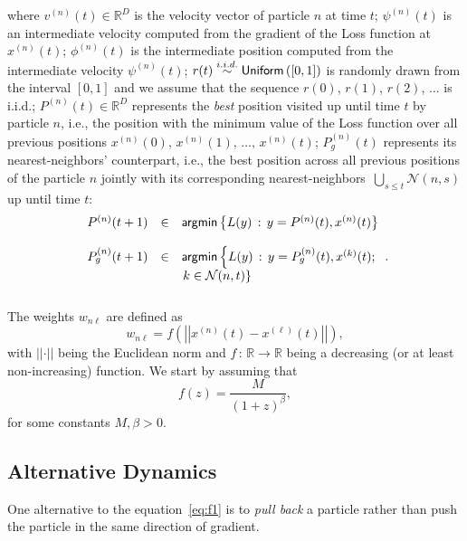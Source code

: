\documentclass{ieeeaccess}
\begin{document}
where $v^{(n)}(t)\in\mathbb{R}^{D}$ is the velocity vector of particle $n$ at time $t$; $\psi^{(n)}(t)$ is an intermediate velocity computed from the gradient of the Loss function at $x^{(n)}(t)$; $\phi^{(n)}(t)$ is the intermediate position computed from the intermediate velocity $\psi^{(n)}(t)$; $r(t)\overset{i.i.d.}\sim {\sf Uniform}\left(\left[0,1\right]\right)$ is randomly drawn from the interval $\left[0,1\right]$ and we assume that the sequence $r(0)$, $r(1)$, $r(2)$, $\ldots$ is i.i.d.; $P^{(n)}(t)\in\mathbb{R}^D$ represents the \emph{best} position visited up until time $t$ by particle $n$, i.e., the position with the minimum value of the Loss function over all previous positions $x^{(n)}(0),\,x^{(n)}(1),\,\ldots,\,x^{(n)}(t)$; $P_{g}^{(n)}(t)$ represents its nearest-neighbors' counterpart, i.e., the best position across all previous positions of the particle $n$ jointly with its corresponding nearest-neighbors~$\bigcup_{s\leq t} \mathcal{N}\left(n,s\right)$ up until time $t$: 
\begin{equation}\label{eq:PSO}
\begin{array}{ccl}
P^{(n)}(t+1) & \in & {\sf argmin}\left\{L(y)\,:\,y=P^{(n)}(t),x^{(n)}(t)\right\}  \\
& & \\
P_{g}^{(n)}(t+1) & \in & {\sf argmin}\left\{L(y)\,:\,y=P_{g}^{(n)}(t),x^{(k)}(t);\right. \\
& & \left.k\in \mathcal{N}(n,t)\right\} \\
& &\\
\end{array}.
\end{equation}
The weights $w_{n\ell}$ are defined as
\begin{equation}
w_{n\ell}= f\left(\left|\left|x^{(n)}(t)-x^{(\ell)}(t)\right|\right|\right),
\end{equation}
with $\left|\left|\cdot\right|\right|$ being the Euclidean norm and $f\,:\,\mathbb{R}\rightarrow \mathbb{R}$ being a decreasing (or at least non-increasing) function. We start by assuming that
\begin{equation}
f(z)= \frac{M}{\left(1+z\right)^{\beta}},
\end{equation}
for some constants $M,\beta>0$.

\subsection{Alternative Dynamics}
One alternative to the equation~\eqref{eq:f1} is to \emph{pull back} a particle rather than push the particle in the same direction of gradient. 
\end{document}
